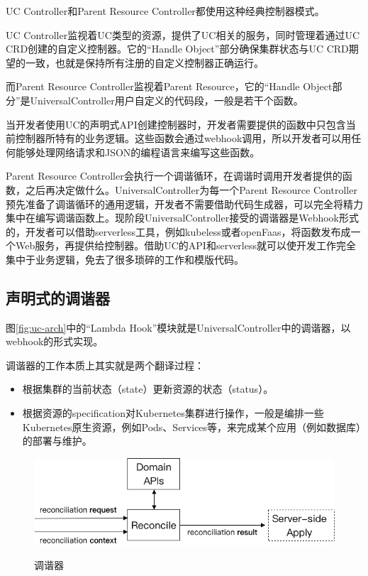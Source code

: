 \documentclass[macfonts,master]{njuthesis}
\begin{document}
UC Controller和Parent Resource Controller都使用这种经典控制器模式。

UC Controller监视着UC类型的资源，提供了UC相关的服务，同时管理着通过UC CRD创建的自定义控制器。它的“Handle Object”部分确保集群状态与UC CRD期望的一致，也就是保持所有注册的自定义控制器正确运行。

而Parent Resource Controller监视着Parent Resource，它的“Handle Object部分”是UniversalController用户自定义的代码段，一般是若干个函数。

当开发者使用UC的声明式API创建控制器时，开发者需要提供的函数中只包含当前控制器所特有的业务逻辑。这些函数会通过webhook调用，所以开发者可以用任何能够处理网络请求和JSON的编程语言来编写这些函数。

Parent Resource Controller会执行一个调谐循环，在调谐时调用开发者提供的函数，之后再决定做什么。UniversalController为每一个Parent Resource Controller预先准备了调谐循环的通用逻辑，开发者不需要借助代码生成器，可以完全将精力集中在编写调谐函数上。现阶段UniversalController接受的调谐器是Webhook形式的，开发者可以借助serverless工具，例如kubeless或者openFaas，将函数发布成一个Web服务，再提供给控制器。借助UC的API和serverless就可以使开发工作完全集中于业务逻辑，免去了很多琐碎的工作和模版代码。

\subsection{声明式的调谐器}
图\ref{fig:uc-arch}中的“Lambda Hook”模块就是UniversalController中的调谐器，以webhook的形式实现。

调谐器的工作本质上其实就是两个翻译过程：
\begin{itemize}
	\item 根据集群的当前状态（state）更新资源的状态（status）。
	\item 根据资源的specification对Kubernetes集群进行操作，一般是编排一些Kubernetes原生资源，例如Pods、Services等，来完成某个应用（例如数据库）的部署与维护。
\end{itemize}

\begin{figure}[htbp]
  \centering
  \includegraphics[width= 1\textwidth]{pics/reconciler-interface.png}\\
  \caption{调谐器}\label{fig:reconciler}
\end{figure}
\end{document}
